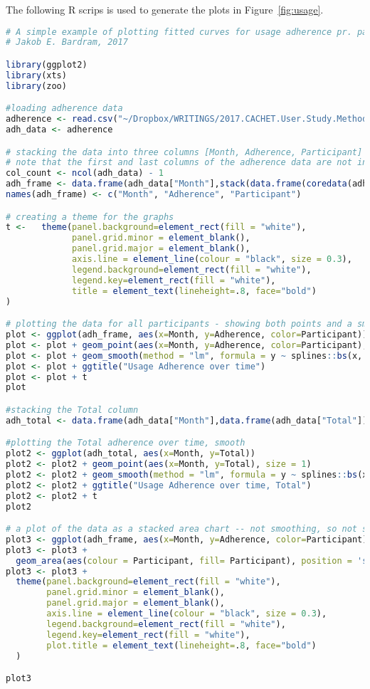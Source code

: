 \noindent The following R scrips is used to generate the plots in  Figure~\ref{fig:usage}.


\begin{lstlisting}[language=R]
# A simple example of plotting fitted curves for usage adherence pr. participant and in total
# Jakob E. Bardram, 2017

library(ggplot2)
library(xts)
library(zoo)

#loading adherence data
adherence <- read.csv("~/Dropbox/WRITINGS/2017.CACHET.User.Study.Methodology/method/adherence.csv", sep=";")
adh_data <- adherence

# stacking the data into three columns [Month, Adherence, Participant] which is to be used by ggplot next
# note that the first and last columns of the adherence data are not included (Month and Total)
col_count <- ncol(adh_data) - 1
adh_frame <- data.frame(adh_data["Month"],stack(data.frame(coredata(adh_data[c(2:col_count)]))))
names(adh_frame) <- c("Month", "Adherence", "Participant")

# creating a theme for the graphs
t <-   theme(panel.background=element_rect(fill = "white"),
             panel.grid.minor = element_blank(),
             panel.grid.major = element_blank(),
             axis.line = element_line(colour = "black", size = 0.3),
             legend.background=element_rect(fill = "white"),
             legend.key=element_rect(fill = "white"),
             title = element_text(lineheight=.8, face="bold")
)

# plotting the data for all participants - showing both points and a smooth 'spline' trend line
plot <- ggplot(adh_frame, aes(x=Month, y=Adherence, color=Participant))
plot <- plot + geom_point(aes(x=Month, y=Adherence, color=Participant), size = 1)
plot <- plot + geom_smooth(method = "lm", formula = y ~ splines::bs(x, 4), se = FALSE)
plot <- plot + ggtitle("Usage Adherence over time")
plot <- plot + t
plot

#stacking the Total column
adh_total <- data.frame(adh_data["Month"],data.frame(adh_data["Total"]))

#plotting the Total adherence over time, smooth
plot2 <- ggplot(adh_total, aes(x=Month, y=Total))
plot2 <- plot2 + geom_point(aes(x=Month, y=Total), size = 1)
plot2 <- plot2 + geom_smooth(method = "lm", formula = y ~ splines::bs(x, 7), se = FALSE)
plot2 <- plot2 + ggtitle("Usage Adherence over time, Total")
plot2 <- plot2 + t
plot2

# a plot of the data as a stacked area chart -- not smoothing, so not so nice...
plot3 <- ggplot(adh_frame, aes(x=Month, y=Adherence, color=Participant))
plot3 <- plot3 +
  geom_area(aes(colour = Participant, fill= Participant), position = 'stack')
plot3 <- plot3 +
  theme(panel.background=element_rect(fill = "white"),
        panel.grid.minor = element_blank(),
        panel.grid.major = element_blank(),
        axis.line = element_line(colour = "black", size = 0.3),
        legend.background=element_rect(fill = "white"),
        legend.key=element_rect(fill = "white"),
        plot.title = element_text(lineheight=.8, face="bold")
  )

plot3

\end{lstlisting}

